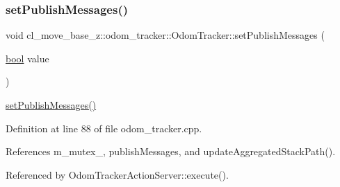 \mbox{\label{classcl__move__base__z_1_1odom__tracker_1_1OdomTracker_a3b3cf9010e4e4fe4f96cfafd5a529517}} 
\subsubsection{\texorpdfstring{set\+Publish\+Messages()}{setPublishMessages()}}
{\footnotesize\ttfamily void cl\+\_\+move\+\_\+base\+\_\+z\+::odom\+\_\+tracker\+::\+Odom\+Tracker\+::set\+Publish\+Messages (\begin{DoxyParamCaption}\item[{\hyperlink{classbool}{bool}}]{value }\end{DoxyParamCaption})}

\hyperlink{classcl__move__base__z_1_1odom__tracker_1_1OdomTracker_a3b3cf9010e4e4fe4f96cfafd5a529517}{set\+Publish\+Messages()} 

Definition at line 88 of file odom\+\_\+tracker.\+cpp.



References m\+\_\+mutex\+\_\+, publish\+Messages, and update\+Aggregated\+Stack\+Path().



Referenced by Odom\+Tracker\+Action\+Server\+::execute().


